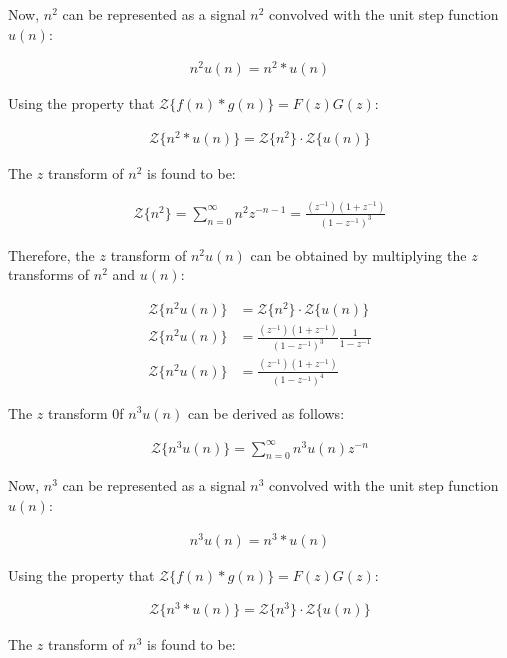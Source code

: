 \documentclass{article}
\begin{document}
Now, $n^2$ can be represented as a signal $n^2$ convolved with the unit step function $u(n)$:

\begin{align}
 n^2u(n) = n^2 * u(n) 
 \end{align}

Using the property that $\mathcal{Z}\{f(n) * g(n)\} = F(z)G(z)$:

\begin{align}
 \mathcal{Z}\{n^2 * u(n)\} = \mathcal{Z}\{n^2\} \cdot \mathcal{Z}\{u(n)\}
  \end{align}

The $z$ transform of $n^2$ is found to be:

\begin{align}
 \mathcal{Z}\{n^2\} = \sum_{n=0}^{\infty} n^2z^{-n-1} = \frac{(z^{-1})(1+z^{-1})}{(1-z^{-1})^3}
  \end{align}



Therefore, the $z$ transform of $n^2u(n)$ can be obtained by multiplying the $z$ transforms of $n^2$ and $u(n)$:

\begin{align}
\mathcal{Z}\{n^2u(n)\} &= \mathcal{Z}\{n^2\} \cdot \mathcal{Z}\{u(n)\} \\
\mathcal{Z}\{n^2u(n)\}&= \frac{(z^{-1})(1+z^{-1})}{(1-z^{-1})^3} \frac{1}{1-z^{-1}} \\
\mathcal{Z}\{n^2u(n)\}&= \frac{(z^{-1})(1+z^{-1})}{(1-z^{-1})^4} 
\end{align}


The $z$ transform 0f $n^3u(n)$ can be derived as follows:

\begin{align}
\mathcal{Z}\{n^3u(n)\} = \sum_{n=0}^{\infty} n^3u(n)z^{-n} \end{align}

Now, $n^3$ can be represented as a signal $n^3$ convolved with the unit step function $u(n)$:

\begin{align}
 n^3u(n) = n^3 * u(n) 
 \end{align}

Using the property that $\mathcal{Z}\{f(n) * g(n)\} = F(z)G(z)$:

\begin{align}
 \mathcal{Z}\{n^3 * u(n)\} = \mathcal{Z}\{n^3\} \cdot \mathcal{Z}\{u(n)\}
  \end{align}

The $z$ transform of $n^3$ is found to be:
\end{document}

